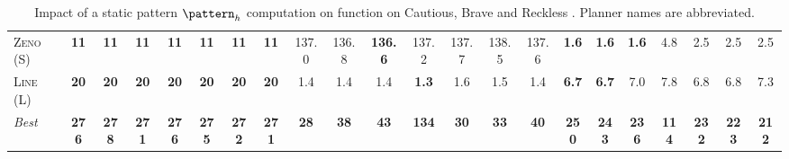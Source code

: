 \begin{table}[tb]
{\begin{tabular}{|l||ccccccc||ccccccc||ccccccc||}
\textsc{Zeno} (S)&\textbf{11}&\textbf{11}&\textbf{11}&\textbf{11}&\textbf{11}&\textbf{11}&\textbf{11}&137.0&136.8&\textbf{136.6}&137.2&137.7&138.5&137.6&\textbf{1.6}&\textbf{1.6}&\textbf{1.6}&4.8&2.5&2.5&2.5\\
\textsc{Line} (L)&\textbf{20}&\textbf{20}&\textbf{20}&\textbf{20}&\textbf{20}&\textbf{20}&\textbf{20}&1.4&1.4&1.4&\textbf{1.3}&1.6&1.5&1.4&\textbf{6.7}&\textbf{6.7}&7.0&7.8&6.8&6.8&7.3
\\\hline
\textit{Best}&\textbf{276}&\textbf{278}&\textbf{271}&\textbf{276}&\textbf{275}&\textbf{272}&\textbf{271}&\textbf{28}&\textbf{38}&\textbf{43}&\textbf{134}&\textbf{30}&\textbf{33}&\textbf{40}&\textbf{250}&\textbf{243}&\textbf{236}&\textbf{114}&\textbf{232}&\textbf{223}&\textbf{212}\\\hline

        \end{tabular}}
        \caption{Impact of a static pattern $\pattern_h$ computation on function on Cautious, Brave and Reckless \pattyd. Planner names are abbreviated.}
        \label{tab:abl-patternh-static}
        \end{table}
        